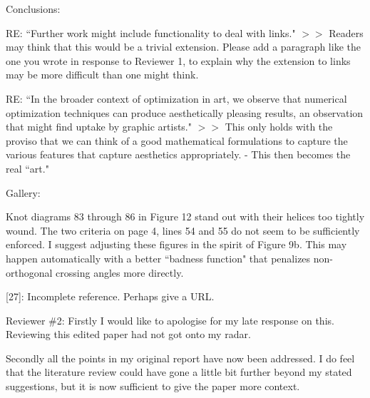 \documentclass[12pt]{article}
\begin{document}
Conclusions:

RE: ``Further work might include functionality to deal
with links."  $>>$ Readers may think that this would be a trivial
extension.  Please add a paragraph like the one you wrote in response
to Reviewer 1, to explain why the extension to links may be more
difficult than one might think.

RE: ``In the broader context of optimization in art, we observe that
numerical optimization techniques can produce aesthetically pleasing
results, an observation that might find uptake by graphic artists."
$>>$ This only holds with the proviso that we can think of a good
mathematical formulations to capture the various features that capture
aesthetics appropriately.  - This then becomes the real ``art."

Gallery:

Knot diagrams 83 through 86 in Figure 12 stand out with their helices
too tightly wound.  The two criteria on page 4, lines 54 and 55 do not
seem to be sufficiently enforced.  I suggest adjusting these figures
in the spirit of Figure 9b.  This may happen automatically with a
better ``badness function" that penalizes non-orthogonal crossing
angles more directly.

[27]:  Incomplete reference.  Perhaps give a URL.



Reviewer \#2: Firstly I would like to apologise for my late response on
this. Reviewing this edited paper had not got onto my radar.

Secondly all the points in my original report have now been
addressed. I do feel that the literature review could have gone a
little bit further beyond my stated suggestions, but it is now
sufficient to give the paper more context.
\end{document}
